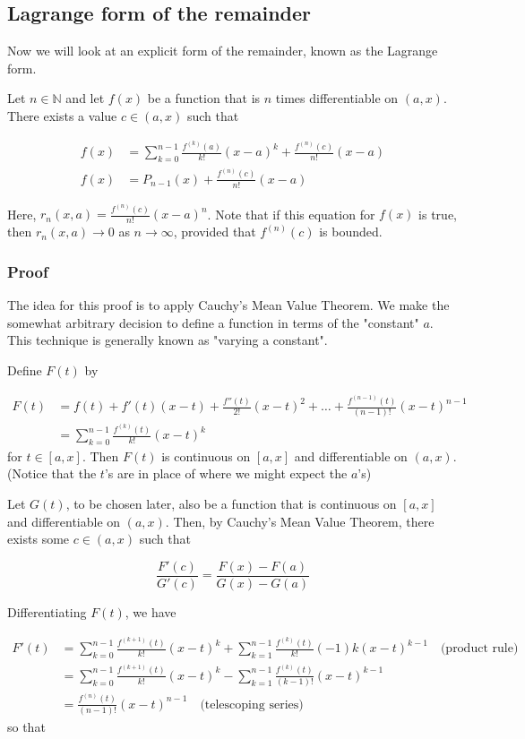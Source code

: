 \documentclass{article}
\begin{document}
\subsection*{Lagrange form of the remainder}

Now we will look at an explicit form of the remainder, known as the Lagrange form.

Let $n \in \mathbb{N}$ and let $f(x)$ be a function that is $n$ times differentiable on $(a,x)$. There exists a value $c \in (a,x)$ such that

\begin{align*}
    f(x) &= \sum_{k=0}^{n-1} \frac{f^{(k)}(a)}{k!} (x-a)^k + \frac{f^{(n)}(c)}{n!} (x-a) \\
    f(x) &= P_{n-1}(x) + \frac{f^{(n)}(c)}{n!} (x-a)
\end{align*}

Here, $r_n(x,a) = \frac{f^{(n)}(c)}{n!} (x-a)^n$. Note that if this equation for $f(x)$ is true, then $r_n(x,a) \to 0$ as $n \to \infty$, provided that $f^{(n)}(c)$ is bounded.

\subsubsection*{Proof}

The idea for this proof is to apply Cauchy's Mean Value Theorem. We make the somewhat arbitrary decision to define a function in terms of the "constant" $a$. This technique is generally known as "varying a constant".

Define $F(t)$ by

\begin{align*}
F(t) &= f(t) + f'(t)(x-t) + \frac{f''(t)}{2!} (x-t)^2 + \ldots + \frac{f^{(n-1)}(t)}{(n-1)!} (x-t)^{n-1} \\
    &= \sum_{k=0}^{n-1} \frac{f^{(k)}(t)}{k!} (x-t)^k
\end{align*}
for $t \in [a,x]$. Then $F(t)$ is continuous on $[a,x]$ and differentiable on $(a,x)$. (Notice that the $t$'s are in place of where we might expect the $a$'s)

Let $G(t)$, to be chosen later, also be a function that is continuous on $[a,x]$ and differentiable on $(a,x)$. Then, by Cauchy's Mean Value Theorem, there exists some $c \in (a,x)$ such that

$$
\frac{F'(c)}{G'(c)} = \frac{F(x) - F(a)}{G(x) - G(a)}
$$

Differentiating $F(t)$, we have

\begin{align*}
F'(t) &= \sum_{k=0}^{n-1} \frac{f^{(k+1)}(t)}{k!} (x-t)^{k} + \sum_{k=1}^{n-1} \frac{f^{(k)}(t)}{k!}(-1)k(x-t)^{k-1} \quad \text{(product rule)} \\
      &= \sum_{k=0}^{n-1} \frac{f^{(k+1)}(t)}{k!} (x-t)^{k} - \sum_{k=1}^{n-1} \frac{f^{(k)}(t)}{(k-1)!}(x-t)^{k-1} \\
      &= \frac{f^{(n)}(t)}{(n-1)!} (x-t)^{n-1} \quad \text{(telescoping series)}
\end{align*}
so that
\end{document}
